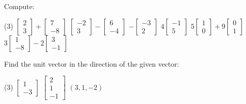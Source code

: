 \begin{exercise}
\pagebreak[2]
Compute:
\begin{tasks}(3)
\task
$\begin{bmatrix}
2 \\
3
\end{bmatrix}
+
\begin{bmatrix}
7 \\
-8
\end{bmatrix}
$
\task
$\begin{bmatrix}
-2 \\
3
\end{bmatrix}
-
\begin{bmatrix}
6 \\
-4
\end{bmatrix}
$
\task
$
-\begin{bmatrix}
-3 \\
2
\end{bmatrix}
$
\task
$
4\begin{bmatrix}
-1 \\
5
\end{bmatrix}
$
\task
$
5\begin{bmatrix}
1 \\
0
\end{bmatrix}
+
9
\begin{bmatrix}
0 \\
1
\end{bmatrix}
$
\task
$
3\begin{bmatrix}
1 \\
-8
\end{bmatrix}
-
2
\begin{bmatrix}
3 \\
-1
\end{bmatrix}
$
\end{tasks}
\end{exercise}

\begin{exercise}
Find the unit vector in the direction of the given vector:
\begin{tasks}(3)
\task
$\begin{bmatrix}
1 \\
-3
\end{bmatrix}
$
\task
$\begin{bmatrix}
2 \\
1 \\
-1
\end{bmatrix}
$
\task
$(3,1,-2)$
\end{tasks}
\end{exercise}


